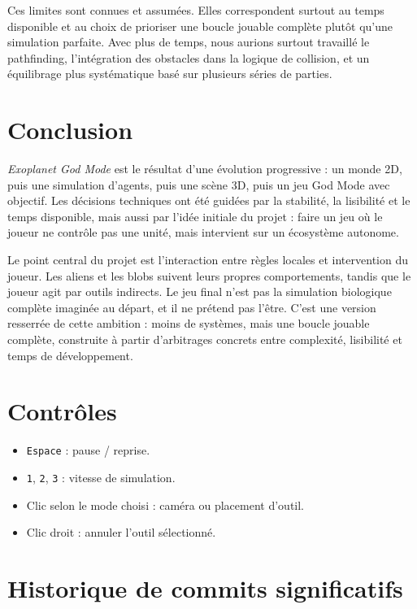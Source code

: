 ﻿\documentclass[11pt,a4paper]{article}
\begin{document}
Ces limites sont connues et assumées. Elles correspondent surtout au temps disponible et au choix de prioriser une boucle jouable complète plutôt qu'une simulation parfaite. Avec plus de temps, nous aurions surtout travaillé le pathfinding, l'intégration des obstacles dans la logique de collision, et un équilibrage plus systématique basé sur plusieurs séries de parties.

\section{Conclusion}

\emph{Exoplanet God Mode} est le résultat d'une évolution progressive : un monde 2D, puis une simulation d'agents, puis une scène 3D, puis un jeu God Mode avec objectif. Les décisions techniques ont été guidées par la stabilité, la lisibilité et le temps disponible, mais aussi par l'idée initiale du projet : faire un jeu où le joueur ne contrôle pas une unité, mais intervient sur un écosystème autonome.

Le point central du projet est l'interaction entre règles locales et intervention du joueur. Les aliens et les blobs suivent leurs propres comportements, tandis que le joueur agit par outils indirects. Le jeu final n'est pas la simulation biologique complète imaginée au départ, et il ne prétend pas l'être. C'est une version resserrée de cette ambition : moins de systèmes, mais une boucle jouable complète, construite à partir d'arbitrages concrets entre complexité, lisibilité et temps de développement.

\appendix

\section{Contrôles}

\begin{itemize}[noitemsep]
  \item \texttt{Espace} : pause / reprise.
  \item \texttt{1}, \texttt{2}, \texttt{3} : vitesse de simulation.
  \item Clic selon le mode choisi : caméra ou placement d'outil.
  \item Clic droit : annuler l'outil sélectionné.
\end{itemize}

\section{Historique de commits significatifs}
\end{document}
